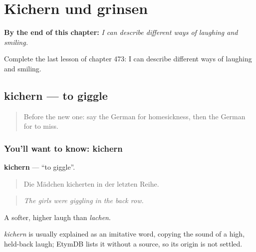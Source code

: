 
\chapter{Kichern und grinsen}
\label{ch:ge-kichern-und-grinsen}

\begin{chapteropening}
\textbf{By the end of this chapter:} \emph{I can describe different ways of laughing and smiling.}

Complete the last lesson of chapter 473: I can describe different ways of laughing and smiling.
\end{chapteropening}

\section[kichern]{kichern — to giggle}

\label{lesson:GE-C473-kichern}



\begin{quote}
Before the new one: say the German for homesickness, then the German for to miss.
\end{quote}

\subsection*{You'll want to know: kichern}
\textbf{kichern} — \textquotedblleft{}to giggle\textquotedblright{}.

\begin{quote}
Die Mädchen kicherten in der letzten Reihe.
\end{quote}

\begin{quote}
\emph{The girls were giggling in the back row.}
\end{quote}

A softer, higher laugh than \emph{lachen}.

\begin{cousinweb}
\emph{kichern} is usually explained as an imitative word, copying the sound of a high, held-back laugh; EtymDB lists it without a source, so its origin is not settled.
\end{cousinweb}

